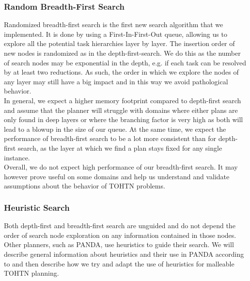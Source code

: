 \subsubsection{Random Breadth-First Search}
Randomized breadth-first search is the first new search algorithm that we implemented. It is done by using a First-In-First-Out queue, allowing us to explore all the potential task hierarchies layer by layer. The insertion order of new nodes is randomized as in the depth-first-search. We do this as the number of search nodes may be exponential in the depth, e.g. if each task can be resolved by at least two reductions.  As such, the order in which we explore the nodes of any layer may still have a big impact and in this way we avoid pathological behavior. \\
In general, we expect a higher memory footprint compared to depth-first search and assume that the planner will struggle with domains where either plans are only found in deep layers or where the branching factor is very high as both will lead to a blowup in the size of our queue. At the same time, we expect the performance of breadth-first search to be a lot more consistent than for depth-first search, as the layer at which we find a plan stays fixed for any single instance. \\
Overall, we do not expect high performance of our breadth-first search. It may however prove useful on some domains and help us understand and validate assumptions about the behavior of TOHTN problems.

\subsubsection{Heuristic Search}
Both depth-first and breadth-first search are unguided and do not depend the order of search node exploration on any information contained in those nodes. Other planners, such as PANDA, use heuristics to guide their search. We will describe general information about heuristics and their use in PANDA according to \cite{holler2020htn} and then describe how we try and adapt the use of heuristics for malleable TOHTN planning.

